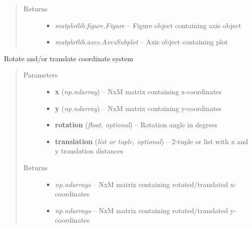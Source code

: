\documentclass[letterpaper,10pt,english]{sphinxmanual}
\begin{document}
\begin{fulllineitems}
\begin{quote}
\begin{description}
\begin{itemize}
\end{itemize}

\item[{Returns}] \leavevmode
\begin{itemize}
\item {} 
\emph{matplotlib.figure.Figure} --
Figure object containing axis object

\item {} 
\emph{matplotlib.axes.AxesSubplot} --
Axis object containing plot

\end{itemize}


\end{description}\end{quote}

\end{fulllineitems}


\begin{fulllineitems}
\label{rectification:flamingo.rectification.plot.rotate_translate}
Rotate and/or translate coordinate system
\begin{quote}\begin{description}
\item[{Parameters}] \leavevmode\begin{itemize}
\item {} 
\textbf{x} (\emph{np.ndarray}) -- NxM matrix containing x-coordinates

\item {} 
\textbf{y} (\emph{np.ndarray}) -- NxM matrix containing y-coordinates

\item {} 
\textbf{rotation} (\emph{float, optional}) -- Rotation angle in degrees

\item {} 
\textbf{translation} (\emph{list or tuple, optional}) -- 2-tuple or list with x and y translation distances

\end{itemize}

\item[{Returns}] \leavevmode
\begin{itemize}
\item {} 
\emph{np.ndarrays} --
NxM matrix containing rotated/translated x-coordinates

\item {} 
\emph{np.ndarrays} --
NxM matrix containing rotated/translated y-coordinates

\end{itemize}


\end{description}\end{quote}

\end{fulllineitems}
\end{document}
